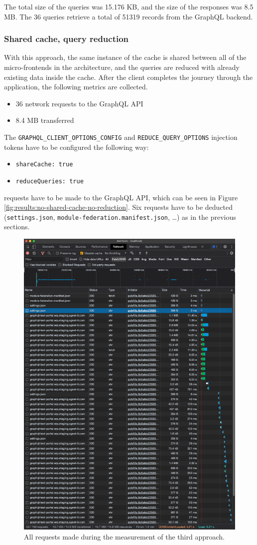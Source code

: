\noindent The total size of the queries was 15.176 KB, and the size of the responses was 8.5 MB. The 36 queries retrieve a total of 51319 records from the GraphQL backend.

\subsubsection{Shared cache, query reduction}\label{subsubsection:results:performance-measurement:separate-cache-reduction}

With this approach, the same instance of the cache is shared between all of the micro-frontends in the architecture, and the queries are reduced with already existing data inside the cache. After the client completes the journey through the application, the following metrics are collected.

\begin{itemize}
  \item 36 network requests to the GraphQL \ac{API}
  \item 8.4 MB transferred
\end{itemize}

\noindent The \texttt{GRAPHQL\_CLIENT\_OPTIONS\_CONFIG} and \texttt{REDUCE\_QUERY\_OPTIONS} injection tokens have to be configured the following way:

\begin{itemize}
  \item \texttt{shareCache: true}
  \item \texttt{reduceQueries: true}
\end{itemize}

 requests have to be made to the GraphQL \ac{API}, which can be seen in Figure \ref{fig:results:no-shared-cache-no-reduction}. Six requests have to be deducted (\texttt{settings.json}, \texttt{module-federation.manifest.json}, \dots) as in the previous sections.

\ifshowImages
\begin{figure}[H]
\centering
\includegraphics[width=0.6\linewidth]{images/results/1-attempt/no-shared-cache-no-reduction.png}
\caption{All requests made during the measurement of the third approach.}\label{fig:results:shared-cache-reduction}
\end{figure}
\fi

